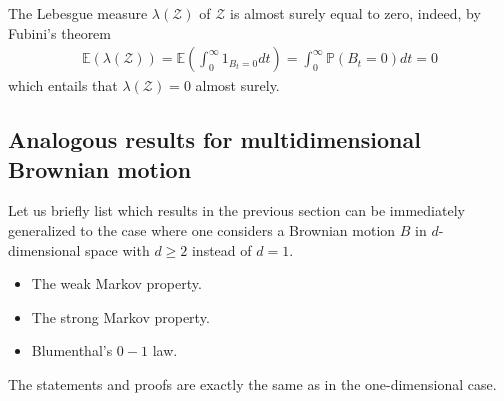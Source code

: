\documentclass[../mainfile.tex]{subfiles}
\begin{document}
\begin{rem} The Lebesgue measure $\lambda ( \mathcal{Z})$ of $\mathcal{Z}$ is almost surely equal to zero, indeed, by Fubini's theorem
\begin{align*}
\mathbb{E}( \lambda ( \mathcal{Z})) = \mathbb{E} \left( \int_0^\infty 1_{B_t=0} dt \right) = \int_0^\infty \mathbb{P}(B_t=0)dt =0
\end{align*}
which entails that $\lambda( \mathcal{Z})=0$ almost surely. 
\end{rem}
\newpage
\subsection{Analogous results for multidimensional Brownian motion}
Let us briefly list which results in the previous section can be immediately generalized to the case where one considers a Brownian motion $B$ in $d$-dimensional space with $d \geq 2$ instead of $d=1$.
\begin{itemize}
\item The weak Markov property.
\item The strong Markov property.
\item Blumenthal's $0-1$ law. 
\end{itemize}
The statements and proofs are exactly the same as in the one-dimensional case. 
\end{document}
